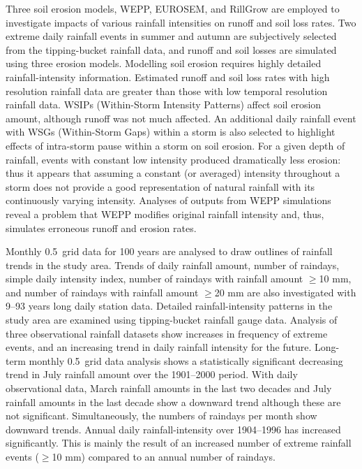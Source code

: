 \begin{abstractseparate}
Three soil erosion models, WEPP, EUROSEM, and RillGrow are employed to
investigate impacts of various rainfall intensities on runoff and soil loss
rates. Two extreme daily rainfall events in summer and autumn are subjectively
selected from the tipping-bucket rainfall data, and runoff and soil losses are
simulated using three erosion models. Modelling soil erosion requires highly
detailed rainfall-intensity information. Estimated runoff and soil loss rates
with high resolution rainfall data are greater than those with low temporal
resolution rainfall data. WSIPs (Within-Storm Intensity Patterns) affect soil
erosion amount, although runoff was not much affected. An additional daily
rainfall event with WSGs (Within-Storm Gaps) within a storm is also selected to
highlight effects of intra-storm pause within a storm on soil erosion.
For a given depth of rainfall, events with constant low intensity produced
dramatically less erosion: thus it appears that assuming a constant (or
averaged) intensity throughout a storm does not provide a good representation of
natural rainfall with its continuously varying intensity.
Analyses of outputs from WEPP simulations reveal a problem that WEPP modifies
original rainfall intensity and, thus, simulates erroneous runoff and erosion
rates.

Monthly 0.5\textdegree\ grid data for 100 years are analysed to draw outlines of
rainfall trends in the study area. Trends of daily rainfall amount, number of
raindays, simple daily intensity index, number of raindays with rainfall amount
$\geq$10 mm, and number of raindays with rainfall amount $\geq$20 mm are also
investigated with 9--93 years long daily station data. Detailed
rainfall-intensity patterns in the study area are examined using tipping-bucket
rainfall gauge data. Analysis of three observational rainfall datasets show
increases in frequency of extreme events, and an increasing trend in daily
rainfall intensity for the future.
Long-term monthly 0.5\textdegree\ grid data analysis shows a statistically
significant decreasing trend in July rainfall amount over the 1901--2000 period.
With daily observational data, March rainfall amounts in the last two decades
and July rainfall amounts in the last decade show a downward trend although
these are not significant.  Simultaneously, the numbers of raindays per month
show downward trends. Annual daily rainfall-intensity over 1904--1996 has
increased significantly. This is mainly the result of an increased number of
extreme rainfall events ($\geq$10 mm) compared to an annual number of raindays.


\end{abstractseparate}
